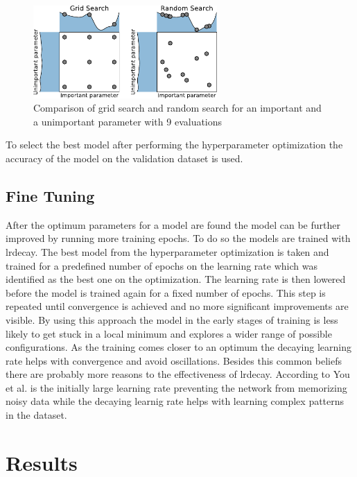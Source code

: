 \documentclass[conference]{IEEEtran}
\begin{document}
\begin{figure}[htp]
	\centering
	\includegraphics[width=7cm]{grid_search_random_search.pdf}
	\caption{Comparison of grid search and random search for an important and a unimportant parameter with 9 evaluations \cite{Feurer2019}}
	\label{fig:grid_search_random_search}
\end{figure}

To select the best model after performing the hyperparameter optimization the accuracy of the model on the validation dataset is used.

\noindent
\subsection{Fine Tuning}

After the optimum parameters for a model are found the model can be further improved by running more training epochs. To do so the models are trained with \gls{lrdecay}. The best model from the hyperparameter optimization is taken and trained for a predefined number of epochs on the learning rate which was identified as the best one on the optimization. The learning rate is then lowered before the model is trained again for a fixed number of epochs. This step is repeated until convergence is achieved and no more significant improvements are visible. By using this approach the model in the early stages of training is less likely to get stuck in a local minimum and explores a wider range of possible configurations. As the training comes closer to an optimum the decaying learning rate helps with convergence and avoid oscillations. Besides this common beliefs there are probably more reasons to the effectiveness of \gls{lrdecay}. According to You et al. \cite{You2019} is the initially large learning rate preventing the network from memorizing noisy data while the decaying learnig rate helps with learning complex patterns in the dataset.


\section{Results}
\label{sec:results}
\end{document}
